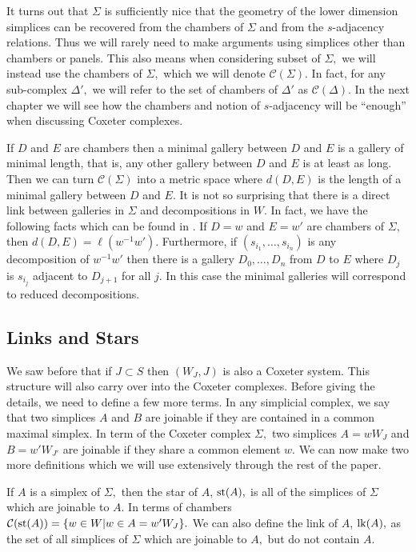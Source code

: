 \documentclass[class=book, crop=false,12 pt]{standalone}
\begin{document}
It turns out that $\Sigma$ is sufficiently nice that the geometry of the lower dimension simplices can be recovered from the chambers of $\Sigma$ and from the $s$-adjacency relations. Thus we will rarely need to make arguments using simplices other than chambers or panels. This also means when considering subset of $\Sigma,$ we will instead use the chambers of $\Sigma,$ which we will denote $\mathcal{C}(\Sigma).$ In fact, for any sub-complex $\Delta',$ we will refer to the set of chambers of $\Delta'$ as $\mathcal{C}(\Delta).$ In the next chapter we will see how the chambers and notion of $s$-adjacency will be ``enough'' when discussing Coxeter complexes.

If $D$ and $E$ are chambers then a minimal gallery between $D$ and $E$ is a gallery of minimal length, that is, any other gallery between $D$ and $E$ is at least as long. Then we can turn $\mathcal{C}(\Sigma)$ into a metric space where $d(D,E)$ is the length of a minimal gallery between $D$ and $E.$ It is not so surprising that there is a direct link between galleries in $\Sigma$ and decompositions in $W.$ In fact, we have the following facts which can be found in \cite{buildings}. If $D=w$ and $E=w'$ are chambers of $\Sigma,$ then $d(D,E)=\ell(w^{-1}w').$ Furthermore, if $(s_{i_1},\dots,s_{i_n})$ is any decomposition of $w^{-1}w'$ then there is a gallery $D_0,\dots,D_n$ from $D$ to $E$ where $D_j$ is $s_{i_j}$ adjacent to $D_{j+1}$ for all $j.$ In this case the minimal galleries will correspond to reduced decompositions.

\subsection{Links and Stars}
We saw before that if $J\subset S$ then $(W_J,J)$ is also a Coxeter system. This structure will also carry over into the Coxeter complexes. Before giving the details, we need to define a few more terms. In any simplicial complex, we say that two simplices $A$ and $B$ are joinable if they are contained in a common maximal simplex. In term of the Coxeter complex $\Sigma,$ two simplices $A=wW_J$ and $B=w'W_{J'}$ are joinable if they share a common element $w.$ We can now make two more definitions which we will use extensively through the rest of the paper.

\begin{defn}
	If $A$ is a simplex of $\Sigma,$ then the star of $A$, $\mathrm{st}(A),$ is all of the simplices of $\Sigma$ which are joinable to $A.$ In terms of chambers $\mathcal{C}(\mathrm{st}(A))=\{w\in W|w\in A=w'W_J\}.$ We can also define the link of $A$, $\mathrm{lk}(A),$ as the set of all simplices of $\Sigma$ which are joinable to $A,$ but do not contain $A.$
\end{defn}
\end{document}
